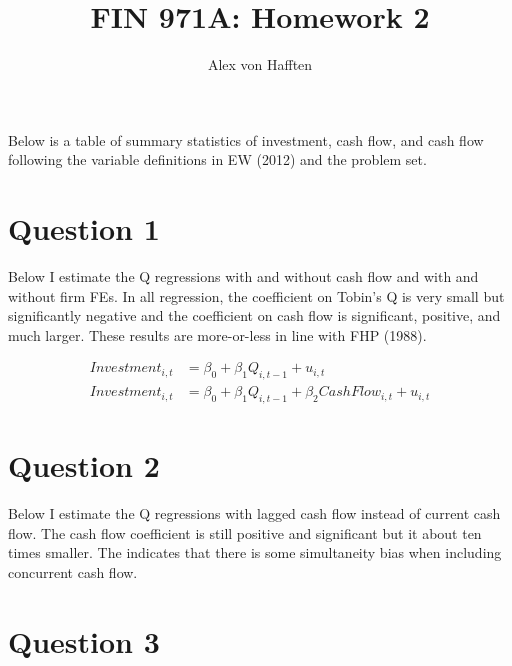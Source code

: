 \documentclass{article}
\title{FIN 971A: Homework 2}
\author{Alex von Hafften }
\begin{document}
\maketitle

Below is a table of summary statistics of investment, cash flow, and cash flow following the variable definitions in EW (2012) and the problem set.

\begin{center}

\end{center}

\section{Question 1}

Below I estimate the Q regressions with and without cash flow and with and without firm FEs.  In all regression, the coefficient on Tobin's Q is very small but significantly negative and the coefficient on cash flow is significant, positive, and much larger.  These results are more-or-less in line with FHP (1988).

\begin{align*}
Investment_{i,t} &= \beta_0 + \beta_1 Q_{i,t-1} + u_{i,t} \\
Investment_{i,t} &= \beta_0 + \beta_1 Q_{i,t-1} + \beta_2 CashFlow_{i,t} + u_{i,t}
\end{align*}

\begin{center}

\end{center}

\pagebreak


\section{Question 2}

Below I estimate the Q regressions with lagged cash flow instead of current cash flow.  The cash flow coefficient is still positive and significant but it about ten times smaller.  The indicates that there is some simultaneity bias when including concurrent cash flow.

\bigskip

\begin{center}

\end{center}

\bigskip


\section{Question 3}
\end{document}
